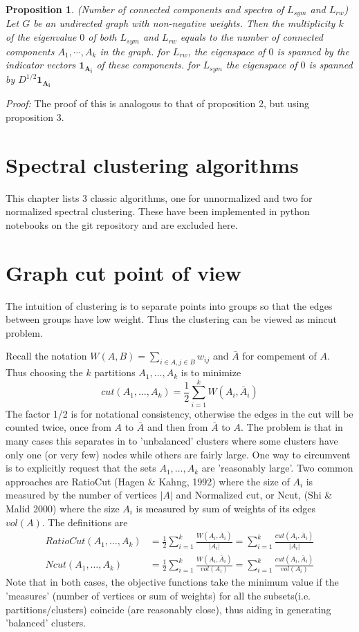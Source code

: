 \documentclass[10pt,a4paper, nocenter]{report}
\newtheorem{prop}{Proposition}
\begin{document}
			\begin{prop}
				(Number of connected components and spectra of $L_{sym}$ and $L_{rw}$) Let $G$ be an undirected graph with non-negative weights. Then the multiplicity $k$ of the eigenvalue $0$ of both $L_{sym}$ and $L_{rw}$ equals to the number of connected components $A_{1},\cdots,A_{k}$ in the graph. for $L_{rw}$, the eigenspace of $0$ is spanned by the indicator vectors $\mathbf{1_{A_{i}}}$ of these components. for $L_{sym}$ the eigenspace of $0$ is spanned by $D^{1/2}\mathbf{1_{A_{i}}}$
			\end{prop}
			\textit{Proof:} The proof of this is analogous to that of proposition 2, but using proposition 3.

	
	\chapter{Spectral clustering algorithms}
	This chapter lists 3 classic algorithms, one for unnormalized and two for normalized spectral clustering. These have been implemented in python notebooks on the git repository and are excluded here.
	
	
	\chapter{Graph cut point of view}
	The intuition of clustering is to separate points into groups so that the edges between groups have low weight. Thus the clustering can be viewed as mincut problem.
	
	Recall the notation $W(A,B) = \sum_{i\in A, j\in B} w_{ij}$ and $\bar{A}$ for compement of $A$. Thus choosing the $k$ partitions $A_{1},\dots,A_{k}$ is to minimize $$ cut(A_{1},\dots,A_{k}) = \frac{1}{2}\sum_{i=1}^{k}W(A_{i},\bar{A}_{i}) $$ 
	The factor 1/2 is for notational consistency, otherwise the edges in the cut will be counted twice, once from $A$ to $\bar{A}$ and then from $\bar{A}$ to $A$. The problem is that in many cases this separates in to 'unbalanced' clusters where some clusters have only one (or very few) nodes while others are fairly large. One way to circumvent is to explicitly request that the sets $A_{1},\dots,A_{k}$ are 'reasonably large'. Two common approaches are RatioCut (Hagen \& Kahng, 1992) where the size of $A_{i}$ is measured by the number of vertices $\lvert A \rvert$ and Normalized cut, or Ncut, (Shi \& Malid 2000) where the size $A_{i}$ is measured by sum of weights of its edges $vol(A)$. The definitions are	
	\begin{align*}
		RatioCut(A_{1},\dots,A_{k}) &= \frac{1}{2} \sum_{i=1}^{k}\frac{W(A_{i},\bar{A}_{i})}{\lvert A_{i} \rvert}
		= \sum_{i=1}^{k}\frac{cut(A_{i},\bar{A}_{i})}{\lvert A_{i} \rvert} \\
		Ncut(A_{1},\dots,A_{k}) &= \frac{1}{2}\sum_{i=1}^{k}\frac{W(A_{i},\bar{A}_{i})}{vol(A_{i})} = 
		\sum_{i=1}^{k}\frac{cut(A_{i},\bar{A}_{i})}{vol(A_{i})}
	\end{align*}
	Note that in both cases, the objective functions take the minimum value if the 'measures' (number of vertices or sum of weights) for all the subsets(i.e. partitions/clusters) coincide (are reasonably close), thus aiding in generating 'balanced' clusters. 
	
\end{document}
